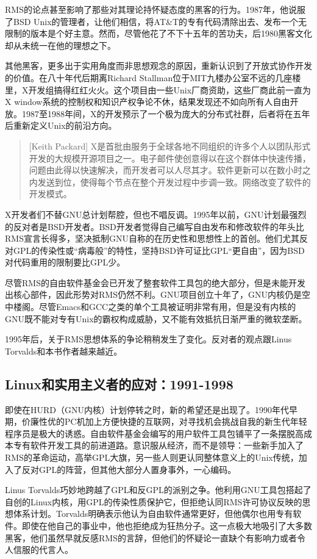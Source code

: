 \documentclass[12pt,oneside]{book}
\begin{document}
RMS的论点甚至影响了那些对其理论持怀疑态度的黑客的行为。1987年，他说服了BSD Unix的管理者，让他们相信，将AT\&{}T的专有代码清除出去、发布一个无限制的版本是个好主意。然而，尽管他花了不下十五年的苦功夫，后1980黑客文化却从未统一在他的理想之下。

其他黑客，更多出于实用角度而非思想观念的原因，重新认识到了开放式协作开发的价值。在八十年代后期离Richard Stallman位于MIT九楼办公室不远的几座楼里，X开发组搞得红红火火。这个项目由一些Unix厂商资助，这些厂商此前一直为X window系统的控制权和知识产权争论不休，结果发现还不如向所有人自由开放。1987至1988年间，X的开发预示了一个极为庞大的分布式社群，后者将在五年后重新定义Unix的前沿方向。

\begin{quote}[Keith Packard]
X是首批由服务于全球各地不同组织的许多个人以团队形式开发的大规模开源项目之一。电子邮件使创意得以在这个群体中快速传播，问题由此得以快速解决，而开发者可以人尽其才。软件更新可以在数小时之内发送到位，使得每个节点在整个开发过程中步调一致。网络改变了软件的开发模式。
\end{quote}

X开发者们不替GNU总计划帮腔，但也不唱反调。1995年以前，GNU计划最强烈的反对者是BSD开发者。BSD开发者觉得自己编写自由发布和修改软件的年头比RMS宣言长得多，坚决抵制GNU自称的在历史性和思想性上的首创。他们尤其反对GPL的传染性或“病毒般”的特性，坚持BSD许可证比GPL“更自由”，因为BSD对代码重用的限制要比GPL少。

尽管RMS的自由软件基金会已开发了整套软件工具包的绝大部分，但是未能开发出核心部件，因此形势对RMS仍然不利。GNU项目创立十年了，GNU内核仍是空中楼阁。尽管Emacs和GCC之类的单个工具被证明非常有用，但是没有内核的GNU既不能对专有Unix的霸权构成威胁，又不能有效抵抗日渐严重的微软垄断。

1995年后，关于RMS思想体系的争论稍稍发生了变化。反对者的观点跟Linus Torvalds和本书作者越来越近。


\subsection{Linux和实用主义者的应对：1991-1998}
即使在HURD（GNU内核）计划停转之时，新的希望还是出现了。1990年代早期，价廉性优的PC机加上方便快捷的互联网，对寻找机会挑战自我的新生代年轻程序员是极大的诱惑。自由软件基金会编写的用户软件工具包铺平了一条摆脱高成本专有软件开发工具的前进道路。意识服从经济，而不是领导：一些新手加入了RMS的革命运动，高举GPL大旗，另一些人则更认同整体意义上的Unix传统，加入了反对GPL的阵营，但其他大部分人置身事外，一心编码。

Linus Torvalds巧妙地跨越了GPL和反GPL的派别之争。他利用GNU工具包搭起了自创的Linux内核，用GPL的传染性质保护它，但拒绝认同RMS许可协议反映的思
想体系计划。Torvalds明确表示他认为自由软件通常更好，但他偶尔也用专有软件。即使在他自己的事业中，他也拒绝成为狂热分子。这一点极大地吸引了大多数黑客，他们虽然早就反感RMS的言辞，但他们的怀疑论一直缺个有影响力或者令人信服的代言人。
\end{document}
